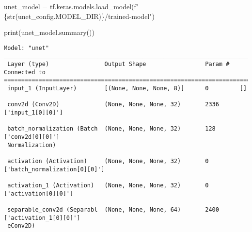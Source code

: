 \documentclass[
  letterpaper,
  DIV=11,
  numbers=noendperiod]{scrreprt}
\newenvironment{Shaded}{\begin{snugshade}}{\end{snugshade}}
\newcommand{\BuiltInTok}[1]{\textcolor[rgb]{0.00,0.23,0.31}{#1}}
\newcommand{\NormalTok}[1]{\textcolor[rgb]{0.00,0.23,0.31}{#1}}
\newcommand{\OperatorTok}[1]{\textcolor[rgb]{0.37,0.37,0.37}{#1}}
\newcommand{\SpecialCharTok}[1]{\textcolor[rgb]{0.37,0.37,0.37}{#1}}
\newcommand{\SpecialStringTok}[1]{\textcolor[rgb]{0.13,0.47,0.30}{#1}}
\begin{document}
\begin{Shaded}
\begin{Highlighting}[]
\NormalTok{unet\_model }\OperatorTok{=}\NormalTok{ tf.keras.models.load\_model(}\SpecialStringTok{f"}\SpecialCharTok{\{}\BuiltInTok{str}\NormalTok{(unet\_config.MODEL\_DIR)}\SpecialCharTok{\}}\SpecialStringTok{/trained{-}model"}\NormalTok{)}
\end{Highlighting}
\end{Shaded}

\begin{Shaded}
\begin{Highlighting}[]
\BuiltInTok{print}\NormalTok{(unet\_model.summary())}
\end{Highlighting}
\end{Shaded}

\begin{verbatim}
Model: "unet"
__________________________________________________________________________________________________
 Layer (type)                Output Shape                 Param #   Connected to                  
==================================================================================================
 input_1 (InputLayer)        [(None, None, None, 8)]      0         []                            
                                                                                                  
 conv2d (Conv2D)             (None, None, None, 32)       2336      ['input_1[0][0]']             
                                                                                                  
 batch_normalization (Batch  (None, None, None, 32)       128       ['conv2d[0][0]']              
 Normalization)                                                                                   
                                                                                                  
 activation (Activation)     (None, None, None, 32)       0         ['batch_normalization[0][0]'] 
                                                                                                  
 activation_1 (Activation)   (None, None, None, 32)       0         ['activation[0][0]']          
                                                                                                  
 separable_conv2d (Separabl  (None, None, None, 64)       2400      ['activation_1[0][0]']        
 eConv2D)                                                                                         
                                                                                                  

\end{verbatim}
\end{document}

